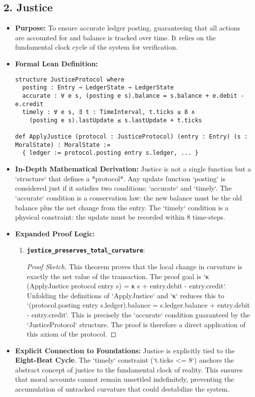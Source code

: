 \documentclass[11pt,a4paper]{article}
\begin{document}
\subsection{2. Justice}
\begin{itemize}
    \item \textbf{Purpose:} To ensure accurate ledger posting, guaranteeing that all actions are accounted for and balance is tracked over time. It relies on the fundamental clock cycle of the system for verification.
    \item \textbf{Formal Lean Definition:}
\begin{lstlisting}
structure JusticeProtocol where
  posting : Entry → LedgerState → LedgerState
  accurate : ∀ e s, (posting e s).balance = s.balance + e.debit - e.credit
  timely : ∀ e s, ∃ t : TimeInterval, t.ticks ≤ 8 ∧
    (posting e s).lastUpdate ≤ s.lastUpdate + t.ticks

def ApplyJustice (protocol : JusticeProtocol) (entry : Entry) (s : MoralState) : MoralState :=
  { ledger := protocol.posting entry s.ledger, ... }
\end{lstlisting}
    \item \textbf{In-Depth Mathematical Derivation:}
        Justice is not a single function but a `structure` that defines a *protocol*. Any update function `posting` is considered just if it satisfies two conditions: `accurate` and `timely`. The `accurate` condition is a conservation law: the new balance must be the old balance plus the net change from the entry. The `timely` condition is a physical constraint: the update must be recorded within 8 time-steps.
    \item \textbf{Expanded Proof Logic:}
        \begin{enumerate}
            \item \textbf{\texttt{justice\_preserves\_total\_curvature}}:
                \begin{proof}[Proof Sketch]
                    This theorem proves that the local change in curvature is exactly the net value of the transaction. The proof goal is `κ (ApplyJustice protocol entry s) = κ s + entry.debit - entry.credit`. Unfolding the definitions of `ApplyJustice` and `κ` reduces this to `(protocol.posting entry s.ledger).balance = s.ledger.balance + entry.debit - entry.credit`. This is precisely the `accurate` condition guaranteed by the `JusticeProtocol` structure. The proof is therefore a direct application of this axiom of the protocol.
                \end{proof}
        \end{enumerate}
    \item \textbf{Explicit Connection to Foundations:} Justice is explicitly tied to the \textbf{Eight-Beat Cycle}. The `timely` constraint (`t.ticks <= 8`) anchors the abstract concept of justice to the fundamental clock of reality. This ensures that moral accounts cannot remain unsettled indefinitely, preventing the accumulation of untracked curvature that could destabilize the system.
\end{itemize}
\end{document}
